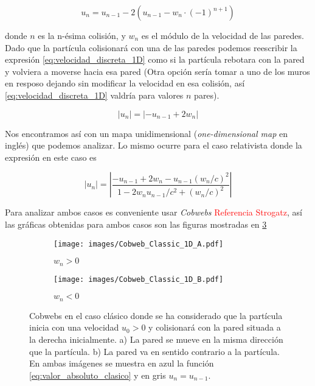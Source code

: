 \documentclass[11pt, spanish]{book}
\begin{document}
\begin{equation}\label{eq:velocidad_discreta_1D}
    u_n = u_{n-1} - 2\left( u_{n-1} - w_n \cdot (-1)^{n+1} \right)
\end{equation}

donde \( n \) es la n-ésima colisión, y \( w_n \) es el módulo de la velocidad de las paredes. Dado que la partícula colisionará con una de las paredes podemos reescribir la expresión \ref{eq:velocidad_discreta_1D} como si la partícula rebotara con la pared y volviera a moverse hacia esa pared (Otra opción sería tomar a uno de los muros en resposo dejando sin modificar la velocidad en esa colisión, así \ref{eq:velocidad_discreta_1D} valdría para valores \( n \) pares). 

\begin{equation}\label{eq:valor_absoluto_clasico}
    \left| u_n \right| =\left| -u_{n-1} + 2w_n \right|
\end{equation}

Nos encontramos así con un mapa unidimensional (\textit{one-dimensional map} en inglés) que podemos analizar. Lo mismo ocurre para el caso relativista donde la expresión en este caso es

\begin{equation}\label{eq:valor_absoluto_relativista}
    \left| u_n \right| = \left|  \dfrac{-u_{n-1} + 2w_n - u_{n-1}(w_n/c)^2}{1 - 2w_n u_{n-1}/c^2 + (w_n/c)^2} \right|
\end{equation}

Para analizar ambos casos es conveniente usar \textit{Cobwebs} \textcolor{red}{Referencia Strogatz}, así las gráficas obtenidas para ambos casos son las figuras mostradas en \ref{fig:Cobweb_Classic_1D}

\begin{figure}[H]
    \centering
    \begin{subfigure}[b]{0.49\textwidth}
        \centering
        \texttt{[image: images/Cobweb\_Classic\_1D\_A.pdf]}
        \caption{$w_n>0$}
        \label{fig:Cobweb_Classic_1D_A}
    \end{subfigure}
    \hfill
    \begin{subfigure}[b]{0.49\textwidth}
        \centering
        \texttt{[image: images/Cobweb\_Classic\_1D\_B.pdf]}
        \caption{$w_n<0$}
        \label{fig:Cobweb_Classic_1D_B}
    \end{subfigure}
    \caption{Cobwebs en el caso clásico donde se ha considerado que la partícula inicia con una velocidad $u_0 > 0$ y colisionará con la pared situada a la derecha inicialmente. a) La pared se mueve en la misma dirección que la partícula. b) La pared va en sentido contrario a la partícula. En ambas imágenes se muestra en azul la función \ref{eq:valor_absoluto_clasico} y en gris \( u_n = u_{n-1} \).}
        \label{fig:Cobweb_Classic_1D}
\end{figure}
\end{document}
